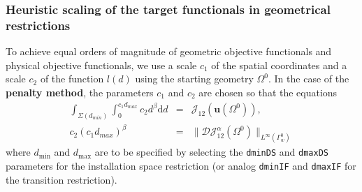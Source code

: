 \documentclass[oneside]{article}
\numberwithin{equation}{section}
\numberwithin{figure}{section}
\newcommand{\Om }{ \Omega}
\newcommand{\buu}{\boldsymbol{u}}
\newcommand{\DD }{ \mathcal{D}}
\newcommand{\JJ }{ \mathcal{J}}
\numberwithin{figure}{section}
\begin{document}
\subsubsection{Heuristic scaling of the target functionals in geometrical restrictions}
To achieve equal orders of magnitude of geometric objective functionals and physical objective functionals, we use a scale $c_1$ of the spatial coordinates and a scale $c_2$ of the function $l(d)$ using the starting geometry $\Omega^0$. In the case of the \textbf{penalty method}, the parameters $c_1$ and $c_2$ are chosen so that the equations
\begin{eqnarray}
\int_{\Sigma\left(d_{min}\right)}\int_0^{c_1 d_{max}} c_2 d^{\beta} \text{d}d &=& \JJ_{12}\left( \buu \left( \Om^0 \right) \right), \\
c_2\left(c_1 d_{max}\right)^\beta &=& \lVert \DD \JJ_{12}^\alpha \left( \Om^{0}  \right) \rVert_{L^\infty \left(\Gamma_w^0\right)}
\end{eqnarray}
where $d_{\min}$ and $d_{\max}$ are to be specified by selecting the \texttt{dminDS} and \texttt{dmaxDS} parameters for the installation space restriction (or analog \texttt{dminIF} and \texttt{dmaxIF} for the transition restriction).
\end{document}
